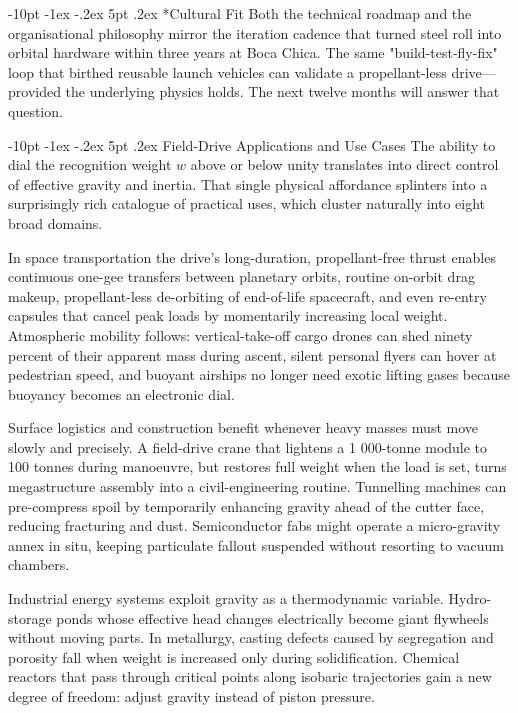 \documentclass[12pt,letterpaper]{book}
\makeatletter
\renewcommand\section{\@startsection{section}{1}{\z@}%
  {-8pt \@plus -1ex \@minus -.2ex}%
  {4pt \@plus.2ex}%
  {\normalfont\large\bfseries}}
\renewcommand\section{\@startsection {section}{1}{\z@}%
                {-10pt \@plus -1ex \@minus -.2ex}%
                {5pt \@plus.2ex}%
                {\normalfont\large\bfseries}}
\makeatother
\begin{document}
\section*{Cultural Fit}
Both the technical roadmap and the organisational philosophy mirror the iteration cadence that turned steel roll into orbital hardware within three years at Boca Chica.  The same "build-test-fly-fix" loop that birthed reusable launch vehicles can validate a propellant-less drive—provided the underlying physics holds.  The next twelve months will answer that question.

\section{Field-Drive Applications and Use Cases}
The ability to dial the recognition weight $w$ above or below unity translates into direct control of effective gravity and inertia.  That single physical affordance splinters into a surprisingly rich catalogue of practical uses, which cluster naturally into eight broad domains.

In space transportation the drive's long-duration, propellant-free thrust enables continuous one-gee transfers between planetary orbits, routine on-orbit drag makeup, propellant-less de-orbiting of end-of-life spacecraft, and even re-entry capsules that cancel peak loads by momentarily increasing local weight.  Atmospheric mobility follows: vertical-take-off cargo drones can shed ninety percent of their apparent mass during ascent, silent personal flyers can hover at pedestrian speed, and buoyant airships no longer need exotic lifting gases because buoyancy becomes an electronic dial.

Surface logistics and construction benefit whenever heavy masses must move slowly and precisely.  A field-drive crane that lightens a 1 000-tonne module to 100 tonnes during manoeuvre, but restores full weight when the load is set, turns megastructure assembly into a civil-engineering routine.  Tunnelling machines can pre-compress spoil by temporarily enhancing gravity ahead of the cutter face, reducing fracturing and dust.  Semiconductor fabs might operate a micro-gravity annex in situ, keeping particulate fallout suspended without resorting to vacuum chambers.

Industrial energy systems exploit gravity as a thermodynamic variable.  Hydro-storage ponds whose effective head changes electrically become giant flywheels without moving parts.  In metallurgy, casting defects caused by segregation and porosity fall when weight is increased only during solidification.  Chemical reactors that pass through critical points along isobaric trajectories gain a new degree of freedom: adjust gravity instead of piston pressure.
\end{document}
